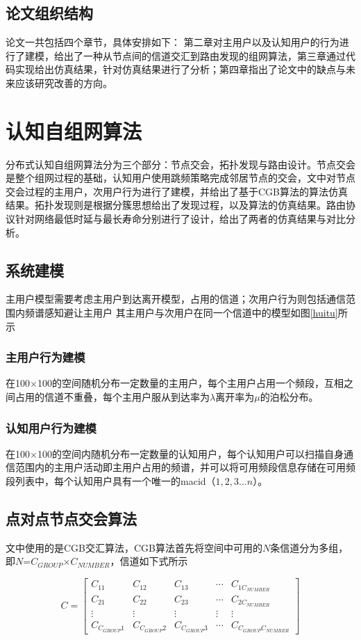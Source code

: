 \documentclass[a4paper,AutoFakeBold,oneside,12pt]{book}
\begin{document}
\section{论文组织结构}
  论文一共包括四个章节，具体安排如下：
  第二章对主用户以及认知用户的行为进行了建模，给出了一种从节点间的信道交汇到路由发现的组网算法，第三章通过代码实现给出仿真结果，针对仿真结果进行了分析；第四章指出了论文中的缺点与未来应该研究改善的方向。
\chapter{认知自组网算法}
  分布式认知自组网算法分为三个部分：节点交会，拓扑发现与路由设计。节点交会是整个组网过程的基础，认知用户使用跳频策略完成邻居节点的交会，文中对节点交会过程的主用户，次用户行为进行了建模，并给出了基于CGB算法的算法仿真结果。拓扑发现则是根据分簇思想给出了发现过程，以及算法的仿真结果。路由协议针对网络最低时延与最长寿命分别进行了设计，给出了两者的仿真结果与对比分析。
\section{系统建模}
  主用户模型需要考虑主用户到达离开模型，占用的信道；次用户行为则包括通信范围内频谱感知避让主用户
  其主用户与次用户在同一个信道中的模型如图\ref{huitu}所示
\subsection{主用户行为建模}
  在100$\times$100的空间随机分布一定数量的主用户，每个主用户占用一个频段，互相之间占用的信道不重叠，每个主用户服从到达率为$\lambda$离开率为$\mu$的泊松分布。
  \subsection{认知用户行为建模}
  在100$\times$100的空间内随机分布一定数量的认知用户，每个认知用户可以扫描自身通信范围内的主用户活动即主用户占用的频谱，并可以将可用频段信息存储在可用频段列表中，每个认知用户具有一个唯一的macid（$1,2,3 ...n$）。
 \section{点对点节点交会算法}
  文中使用的是CGB交汇算法\cite{认知无线自组网中组网技术研究}，CGB算法首先将空间中可用的$N$条信道分为多组，即$N$=$C_{GROUP}$$\times$$C_{NUMBER}$，信道如下式所示
  
\begin{equation}
C={
\left[
\begin{matrix}
C_{11} & C_{12} & C_{13}  &\cdots & C_{1C_{NUMBER}} \\
C_{21} & C_{22} & C_{23}  &\cdots & C_{2C_{NUMBER}} \\
\vdots & \vdots & \vdots  &\vdots &  \vdots \\
C_{C_{GROUP}1} & C_{C_{GROUP}2} & C_{C_{GROUP}3}  &\cdots & C_{C_{GROUP}C_{NUMBER}} 
\end{matrix}  
\right]}
\end{equation}
 
\end{document}
